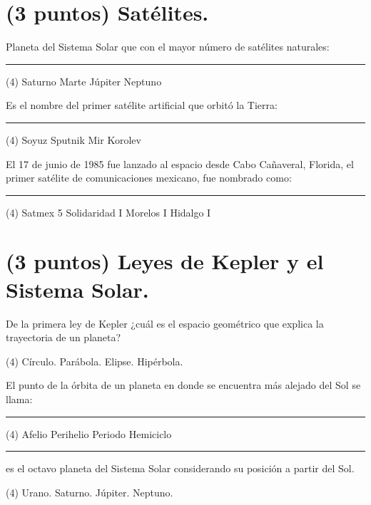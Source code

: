 \documentclass[12pt, letter]{exam}
\begin{document}
\begin{questions}

    \section{(3 puntos) Satélites.}

    \question Planeta del Sistema Solar que con el mayor número de satélites naturales: \rule{2cm}{0.1mm}
    \begin{tasks}(4)
        \task Saturno
        \task Marte
        \task Júpiter
        \task Neptuno
    \end{tasks}
    \question Es el nombre del primer satélite artificial que orbitó la Tierra: \rule{2cm}{0.1mm}
    \begin{tasks}(4)
        \task Soyuz
        \task Sputnik
        \task Mir
        \task Korolev
    \end{tasks}
    \question El 17 de junio de 1985 fue lanzado al espacio desde Cabo Cañaveral, Florida, el primer satélite de comunicaciones mexicano, fue nombrado como: \rule{2cm}{0.1mm}
    \begin{tasks}(4)
        \task Satmex 5
        \task Solidaridad I
        \task Morelos I
        \task Hidalgo I
    \end{tasks}


    \section{(3 puntos) Leyes de Kepler y el Sistema Solar.}

    \question De la primera ley de Kepler ¿cuál es el espacio geométrico que explica la trayectoria de un planeta?
    \begin{tasks}(4)
        \task Círculo.
        \task Parábola.
        \task Elipse.
        \task Hipérbola.
    \end{tasks}
    \question El punto de la órbita de un planeta en donde se encuentra más alejado del Sol se llama: \rule{2cm}{0.1mm}
    \begin{tasks}(4)
        \task Afelio
        \task Perihelio
        \task Periodo
        \task Hemiciclo
    \end{tasks}
    \question \rule{2cm}{0.1mm} es el octavo planeta del Sistema Solar considerando su posición a partir del Sol.
    \begin{tasks}(4)
        \task Urano.
        \task Saturno.
        \task Júpiter.
        \task Neptuno.
    \end{tasks}
   

\end{questions}
\end{document}

